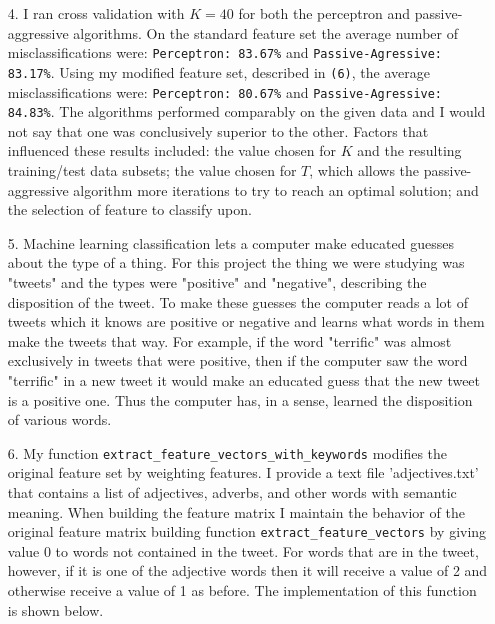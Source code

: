 \documentclass{article}
\begin{document}
\begin{enumerate}
\bigskip

\item[4.] I ran cross validation with $K=40$ for both the perceptron and passive-aggressive algorithms. On the standard feature set the average number of misclassifications were: \texttt{Perceptron: 83.67\%} and \texttt{Passive-Agressive: 83.17\%}. Using my modified feature set, described in \texttt{(6)}, the average misclassifications were: \texttt{Perceptron: 80.67\%} and \texttt{Passive-Agressive: 84.83\%}. The algorithms performed comparably on the given data and I would not say that one was conclusively superior to the other. Factors that influenced these results included: the value chosen for $K$ and the resulting training/test data subsets; the value chosen for $T$, which allows the passive-aggressive algorithm more iterations to try to reach an optimal solution; and the selection of feature to classify upon. 

\newpage

\item[5.] Machine learning classification lets a computer make educated guesses about the type of a thing. For this project the thing we were studying was "tweets" and the types were "positive" and "negative", describing the disposition of the tweet. To make these guesses the computer reads a lot of tweets which it knows are positive or negative and learns what words in them make the tweets that way. For example, if the word "terrific" was almost exclusively in tweets that were positive, then if the computer saw the word "terrific" in a new tweet it would make an educated guess that the new tweet is a positive one. Thus the computer has, in a sense, learned the disposition of various words.

\bigskip

\item[6.] My function \texttt{extract\_feature\_vectors\_with\_keywords} modifies the original feature set by weighting features. I provide a text file 'adjectives.txt' that contains a list of adjectives, adverbs, and other words with semantic meaning. When building the feature matrix I maintain the behavior of the original feature matrix building function \texttt{extract\_feature\_vectors} by giving value 0 to words not contained in the tweet. For words that are in the tweet, however, if it is one of the adjective words then it will receive a value of 2 and otherwise receive a value of 1 as before. The implementation of this function is shown below.

\bigskip 


\end{enumerate}
\end{document}
